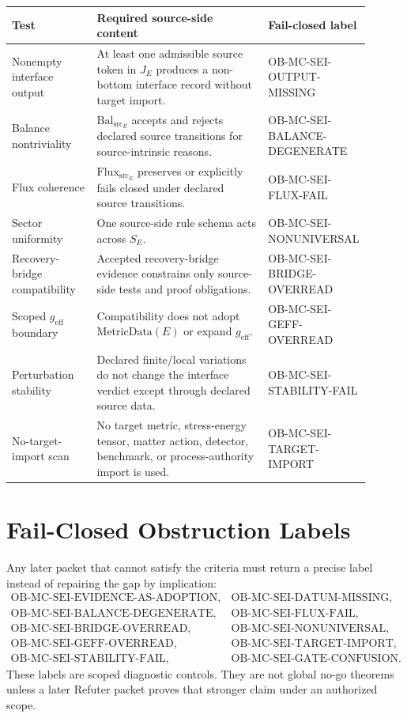 \documentclass[11pt]{article}
\newcommand{\MetricData}{\mathrm{MetricData}}
\newcommand{\geff}{g_{\mathrm{eff}}}
\newcommand{\BalSrc}{\mathrm{Bal}_{\mathrm{src}}}
\newcommand{\FluxSrc}{\mathrm{Flux}_{\mathrm{src}}}
\begin{document}
\begin{longtable}{p{0.24\linewidth}p{0.50\linewidth}p{0.16\linewidth}}
\toprule
Test & Required source-side content & Fail-closed label \\
\midrule
Nonempty interface output & At least one admissible source token in
\(J_E\) produces a non-bottom interface record without target import. &
OB-MC-SEI-OUTPUT-MISSING \\
Balance nontriviality & \(\BalSrc_E\) accepts and rejects declared source
transitions for source-intrinsic reasons. & OB-MC-SEI-BALANCE-DEGENERATE \\
Flux coherence & \(\FluxSrc_E\) preserves or explicitly fails closed under
declared source transitions. & OB-MC-SEI-FLUX-FAIL \\
Sector uniformity & One source-side rule schema acts across \(S_E\). &
OB-MC-SEI-NONUNIVERSAL \\
Recovery-bridge compatibility & Accepted recovery-bridge evidence constrains
only source-side tests and proof obligations. & OB-MC-SEI-BRIDGE-OVERREAD \\
Scoped \(\geff\) boundary & Compatibility does not adopt \(\MetricData(E)\)
or expand \(\geff\). & OB-MC-SEI-GEFF-OVERREAD \\
Perturbation stability & Declared finite/local variations do not change the
interface verdict except through declared source data. & OB-MC-SEI-STABILITY-FAIL \\
No-target-import scan & No target metric, stress-energy tensor, matter
action, detector, benchmark, or process-authority import is used. &
OB-MC-SEI-TARGET-IMPORT \\
\bottomrule
\end{longtable}

\section{Fail-Closed Obstruction Labels}

Any later packet that cannot satisfy the criteria must return a precise label
instead of repairing the gap by implication:
\[
\begin{array}{ll}
\mathrm{OB\mbox{-}MC\mbox{-}SEI\mbox{-}EVIDENCE\mbox{-}AS\mbox{-}ADOPTION},&
\mathrm{OB\mbox{-}MC\mbox{-}SEI\mbox{-}DATUM\mbox{-}MISSING},\\
\mathrm{OB\mbox{-}MC\mbox{-}SEI\mbox{-}BALANCE\mbox{-}DEGENERATE},&
\mathrm{OB\mbox{-}MC\mbox{-}SEI\mbox{-}FLUX\mbox{-}FAIL},\\
\mathrm{OB\mbox{-}MC\mbox{-}SEI\mbox{-}BRIDGE\mbox{-}OVERREAD},&
\mathrm{OB\mbox{-}MC\mbox{-}SEI\mbox{-}NONUNIVERSAL},\\
\mathrm{OB\mbox{-}MC\mbox{-}SEI\mbox{-}GEFF\mbox{-}OVERREAD},&
\mathrm{OB\mbox{-}MC\mbox{-}SEI\mbox{-}TARGET\mbox{-}IMPORT},\\
\mathrm{OB\mbox{-}MC\mbox{-}SEI\mbox{-}STABILITY\mbox{-}FAIL},&
\mathrm{OB\mbox{-}MC\mbox{-}SEI\mbox{-}GATE\mbox{-}CONFUSION}.
\end{array}
\]
These labels are scoped diagnostic controls. They are not global no-go
theorems unless a later Refuter packet proves that stronger claim under an
authorized scope.
\end{document}
